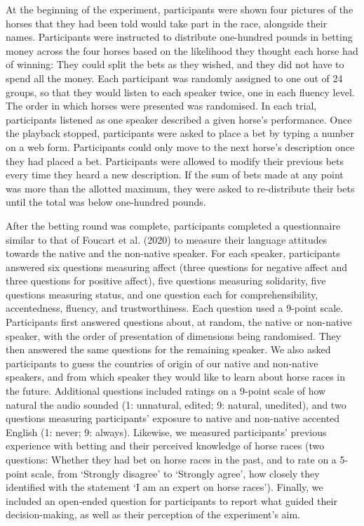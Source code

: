 \documentclass[
  man,floatsintext]{apa7}
\begin{document}
At the beginning of the experiment, participants were shown four pictures of the horses that they had been told would take part in the race, alongside their names. Participants were instructed to distribute one-hundred pounds in betting money across the four horses based on the likelihood they thought each horse had of winning: They could split the bets as they wished, and they did not have to spend all the money. Each participant was randomly assigned to one out of 24 groups, so that they would listen to each speaker twice, one in each fluency level. The order in which horses were presented was randomised. In each trial, participants listened as one speaker described a given horse's performance. Once the playback stopped, participants were asked to place a bet by typing a number on a web form. Participants could only move to the next horse's description once they had placed a bet. Participants were allowed to modify their previous bets every time they heard a new description. If the sum of bets made at any point was more than the allotted maximum, they were asked to re-distribute their bets until the total was below one-hundred pounds.

After the betting round was complete, participants completed a questionnaire similar to that of Foucart et al. (2020) to measure their language attitudes towards the native and the non-native speaker. For each speaker, participants answered six questions measuring affect (three questions for negative affect and three questions for positive affect), five questions measuring solidarity, five questions measuring status, and one question each for comprehensibility, accentedness, fluency, and trustworthiness. Each question used a 9-point scale. Participants first answered questions about, at random, the native or non-native speaker, with the order of presentation of dimensions being randomised. They then answered the same questions for the remaining speaker. We also asked participants to guess the countries of origin of our native and non-native speakers, and from which speaker they would like to learn about horse races in the future. Additional questions included ratings on a 9-point scale of how natural the audio sounded (1: unnatural, edited; 9: natural, unedited), and two questions measuring participants' exposure to native and non-native accented English (1: never; 9: always). Likewise, we measured participants' previous experience with betting and their perceived knowledge of horse races (two questions: Whether they had bet on horse races in the past, and to rate on a 5-point scale, from `Strongly disagree' to `Strongly agree', how closely they identified with the statement `I am an expert on horse races'). Finally, we included an open-ended question for participants to report what guided their decision-making, as well as their perception of the experiment's aim.
\end{document}
